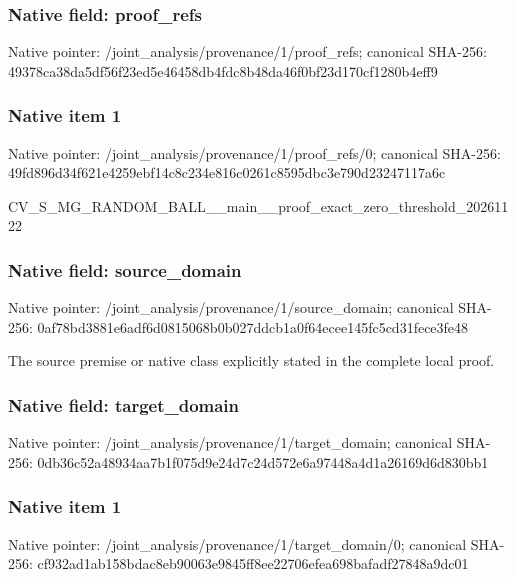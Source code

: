 \documentclass[10pt,a4paper]{article}
\begin{document}
\subsubsection{Native field: proof\_refs}


Native pointer: /joint\_analysis/provenance/1/proof\_refs; canonical SHA-256: 49378ca38da5df56f23ed5e4\allowbreak{}6458db4fdc8b48da46f0bf23\allowbreak{}d170cf1280b4eff9



\subsubsection{Native item 1}


Native pointer: /joint\_analysis/provenan\allowbreak{}ce/1/proof\_refs/0; canonical SHA-256: 49fd896d34f621e4259ebf14\allowbreak{}c8c234e816c0261c8595dbc3\allowbreak{}e790d23247117a6c


CV\_S\_MG\_RANDOM\_BALL\_\_mai\allowbreak{}n\_\_proof\_exact\_zero\_thre\allowbreak{}shold\_20261122


\subsubsection{Native field: source\_domain}


Native pointer: /joint\_analysis/provenan\allowbreak{}ce/1/source\_domain; canonical SHA-256: 0af78bd3881e6adf6d081506\allowbreak{}8b0b027ddcb1a0f64ecee145\allowbreak{}fc5cd31fece3fe48


The source premise or native class explicitly stated in the complete local proof.


\subsubsection{Native field: target\_domain}


Native pointer: /joint\_analysis/provenan\allowbreak{}ce/1/target\_domain; canonical SHA-256: 0db36c52a48934aa7b1f075d\allowbreak{}9e24d7c24d572e6a97448a4d\allowbreak{}1a26169d6d830bb1



\subsubsection{Native item 1}


Native pointer: /joint\_analysis/provenan\allowbreak{}ce/1/target\_domain/0; canonical SHA-256: cf932ad1ab158bdac8eb9006\allowbreak{}3e9845ff8ee22706efea698b\allowbreak{}afadf27848a9dc01
\end{document}
